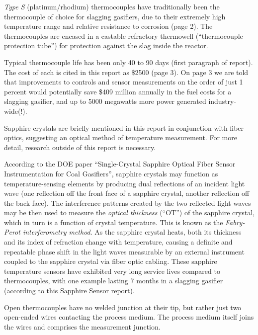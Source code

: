 \vskip 10pt

{\it Type S} (platinum/rhodium) thermocouples have traditionally been the thermocouple of choice for slagging gasifiers, due to their extremely high temperature range and relative resistance to corrosion (page 2).  The thermocouples are encased in a castable refractory thermowell (``thermocouple protection tube'') for protection against the slag inside the reactor.

\vskip 10pt

Typical thermocouple life has been only 40 to 90 days (first paragraph of report).  The cost of each is cited in this report as \$2500 (page 3).  On page 3 we are told that improvements to controls and sensor measurements on the order of just 1 percent would potentially save \$409 million annually in the fuel costs for a slagging gasifier, and up to 5000 megawatts more power generated industry-wide(!).

\vskip 10pt

Sapphire crystals are briefly mentioned in this report in conjunction with fiber optics, suggesting an optical method of temperature measurement.  For more detail, research outside of this report is necessary.

According to the DOE paper ``Single-Crystal Sapphire Optical Fiber Sensor Instrumentation for Coal Gasifiers'', sapphire crystals may function as temperature-sensing elements by producing dual reflections of an incident light wave (one reflection off the front face of a sapphire crystal, another reflection off the back face).  The interference patterns created by the two reflected light waves may be then used to measure the {\it optical thickness} (``OT'') of the sapphire crystal, which in turn is a function of crystal temperature.  This is known as the {\it Fabry-Perot interferometry method}.  As the sapphire crystal heats, both its thickness and its index of refraction change with temperature, causing a definite and repeatable phase shift in the light waves measurable by an external instrument coupled to the sapphire crystal via fiber optic cabling.  These sapphire temperature sensors have exhibited very long service lives compared to thermocouples, with one example lasting 7 months in a slagging gasifier (according to this Sapphire Sensor report).

\vskip 10pt

Open thermocouples have no welded junction at their tip, but rather just two open-ended wires contacting the process medium.  The process medium itself joins the wires and comprises the measurement junction.

